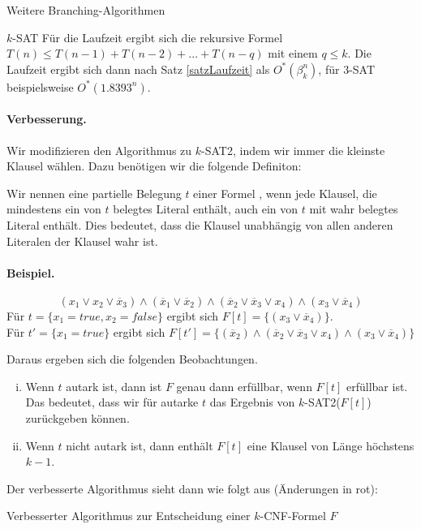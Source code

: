 \begin{section}{Weitere Branching-Algorithmen}
\begin{subsection}{$k$-SAT}
  Für die Laufzeit ergibt sich die rekursive Formel \(T(n) \leq T(n-1) + T(n-2) + ... + T(n-q)\) mit einem \(q \leq k\). Die Laufzeit ergibt sich dann nach Satz \ref{satzLaufzeit} als $O^*(\beta_k^n)$, für \(3\)-SAT beispielsweise \(O^*(1.8393^n)\).

  \paragraph{Verbesserung.} Wir modifizieren den Algorithmus zu \(k\)-SAT2, indem wir immer die kleinste Klausel wählen. Dazu benötigen wir die folgende Definiton:
  \begin{definition}
  Wir nennen eine partielle Belegung \(t\) einer Formel , wenn jede Klausel, die mindestens ein von \(t\) belegtes Literal enthält, auch ein von \(t\) mit wahr belegtes Literal enthält. Dies bedeutet, dass die Klausel unabhängig von allen anderen Literalen der Klausel wahr ist. 
  \end{definition}
  \paragraph{Beispiel.}
  \[(x_1\vee x_2\vee \overline{x}_3) \wedge (\overline{x}_1 \vee \overline{x}_2) \wedge(\overline{x}_2 \vee \overline{x}_3 \vee x_4)\wedge (x_3 \vee \overline{x}_4)\]
  Für $t = \{x_1 = true, x_2 = false\}$ ergibt sich $F[t] = \{(x_3 \vee \overline{x}_4)\}$.\\
  Für $t' = \{x_1 = true\}$ ergibt sich $F[t'] = \{(\overline{x}_2) \wedge (\overline{x}_2 \vee \overline{x}_3 \vee x_4) \wedge (x_3 \vee\overline{x}_4)\}$

  Daraus ergeben sich die folgenden Beobachtungen.
  
  \begin{enumerate}[(i)]
   \item Wenn \(t\) autark ist, dann ist \(F\) genau dann erfüllbar, wenn \(F[t]\) erfüllbar ist. Das bedeutet, dass wir für autarke \(t\) das Ergebnis von \(k\)-SAT2(\(F[t]\)) zurückgeben können.
   \item Wenn \(t\) nicht autark ist, dann enthält \(F[t]\) eine Klausel von Länge höchstens \(k-1\).
  \end{enumerate}
  
  Der verbesserte Algorithmus sieht dann wie folgt aus (Änderungen in {\color{red}rot}):
  
\end{subsection}
  \begin{algorithm}[H]
    \caption{Verbesserter Algorithmus zur Entscheidung einer \(k\)-CNF-Formel \(F\)}


\end{algorithm}
\end{section}
